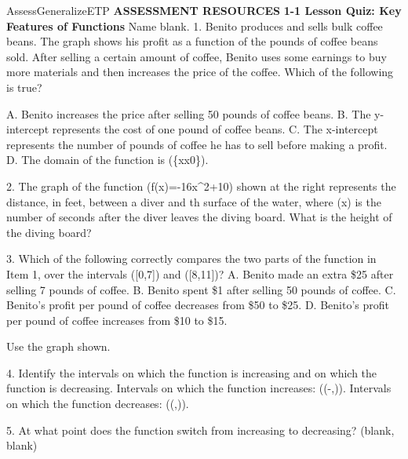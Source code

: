 \documentclass{article}
\newenvironment{te-addendum}[2]{}{}     %
\newcommand{\answer}[1]{}               %
\newcommand{\placeholder}[2]{}          %
\newcommand{\te}[1]{}                   %
\begin{document}
\begin{te-addendum}{Assess}{GeneralizeETP}
\textbf{ASSESSMENT RESOURCES}
\textbf{1-1 Lesson Quiz: Key Features of Functions}
Name blank.
1. Benito produces and sells bulk coffee beans. The graph shows his profit as a function of the pounds of coffee beans sold. After selling a certain amount of coffee, Benito uses some earnings to buy more materials and then increases the price of the coffee. Which of the following is true?
\placeholder{graph}{Quiz 1 and 3: black polyline with filled dots at (0,-20), (1,-10), (2,0), (3,10), (4,20), (5,30), (6,40), (7,50), (8,25), (9,40), (10,55), (11,70). x-axis “Pounds of coffee sold,” labeled 2,4,6,8,10 with unit grid; y-axis “Profit (dollars),” labeled -20,20,40,60,80 with ten-dollar grid. Origin O, axes x/y with arrowheads, window approximately x=-2 to 12 and y=-40 to 90. No polyline arrows.}
A. Benito increases the price after selling 50 pounds of coffee beans.
B. The y-intercept represents the cost of one pound of coffee beans.
C. The x-intercept represents the number of pounds of coffee he has to sell before making a profit.
D. The domain of the function is (\{x\mid x0\}).
\answer{1. C}
2. The graph of the function (f(x)=-16x^2+10) shown at the right represents the distance, in feet, between a diver and th surface of the water, where (x) is the number of seconds after the diver leaves the diving board. What is the height of the diving board?
\te{Printed “th surface”; likely “the surface.”}
\placeholder{graph}{Quiz 2: black downward-curving arc f(x)=-16x^2+10 in first quadrant, begins at (0,10) and ends with downward-right arrow at approximately (0.79,0). x-axis “Time (s)” labels 0.5 and 1, grid 0.1; y-axis “Distance (ft)” labels 5 and 10, grid 1. Origin O, axes arrowed; visible window [0,1] by [0,10]. No point circles.}
\answer{2. 10 feet}
3. Which of the following correctly compares the two parts of the function in Item 1, over the intervals ([0,7]) and ([8,11])?
A. Benito made an extra \$25 after selling 7 pounds of coffee.
B. Benito spent \$1 after selling 50 pounds of coffee.
C. Benito’s profit per pound of coffee decreases from \$50 to \$25.
D. Benito’s profit per pound of coffee increases from \$10 to \$15.
\answer{3. D}
Use the graph shown.
\placeholder{graph}{Quiz 4–5: black downward parabola with vertex (1,4), x-intercepts -1 and 3, y-intercept 3, downward arrows at both ends. Unit square grid approximately x=-3 to 5, y=-6 to 6. Axes x/y arrowed, origin O; x labels -2,2,4, y labels -4,-2,2,4. No marked point circles.}
4. Identify the intervals on which the function is increasing and on which the function is decreasing.
Intervals on which the function increases: ((-\infty,)).
Intervals on which the function decreases: ((,\infty)).
\answer{4. Increases: ((-\infty,1)); decreases: ((1,\infty)).}
5. At what point does the function switch from increasing to decreasing? (blank, blank)
\answer{5. (1,4)}
\te{Lesson Quiz is available at SavvasRealize.com. enVision Algebra 2 • Assessment Sourcebook. Copyright © Savvas Learning Company LLC. All Rights Reserved.}
\end{te-addendum}
\end{document}
